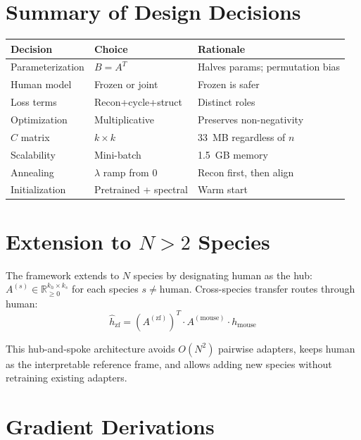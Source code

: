 \documentclass[10pt,twocolumn,letterpaper]{article}
\begin{document}
\section{Summary of Design Decisions}

\begin{table}[h]
\centering\small
\begin{tabular}{@{}lll@{}}
\toprule
Decision & Choice & Rationale \\
\midrule
Parameterization & $B = A^T$ & Halves params; permutation bias \\
Human model & Frozen or joint & Frozen is safer \\
Loss terms & Recon+cycle+struct & Distinct roles \\
Optimization & Multiplicative & Preserves non-negativity \\
$C$ matrix & $k \times k$ & 33~MB regardless of $n$ \\
Scalability & Mini-batch & 1.5~GB memory \\
Annealing & $\lambda$ ramp from 0 & Recon first, then align \\
Initialization & Pretrained + spectral & Warm start \\
\bottomrule
\end{tabular}
\end{table}

\appendix
\section{Extension to $N > 2$ Species}

The framework extends to $N$ species by designating human as the hub:
$A^{(s)} \in \mathbb{R}_{\geq 0}^{k_h \times k_s}$ for each species
$s \neq \text{human}$. Cross-species transfer routes through human:
\begin{equation}
  \hat{h}_{\text{zf}} = (A^{(\text{zf})})^T \cdot A^{(\text{mouse})} \cdot h_{\text{mouse}}
\end{equation}

This hub-and-spoke architecture avoids $O(N^2)$ pairwise adapters, keeps human
as the interpretable reference frame, and allows adding new species without
retraining existing adapters.

\section{Gradient Derivations}
\end{document}
